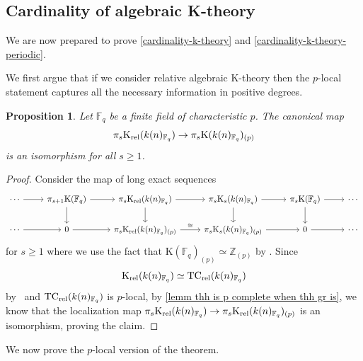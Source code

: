 \documentclass[english,10pt]{amsart}
\newcommand{\field}{\mathbb{F}}
\newtheorem{prop}{Proposition}[section]
\theoremstyle{definition}
\numberwithin{equation}{section}
\begin{document}
\subsection{Cardinality of algebraic K-theory}
We are now prepared to prove \autoref{cardinality-k-theory} and \autoref{cardinality-k-theory-periodic}. 

We first argue that if we consider relative algebraic K-theory then the $p$-local statement captures all the necessary information in positive degrees. 
\begin{prop}\label{relative-p-local}
Let $\field_q$ be a finite field of characteristic $p$. The canonical map 
\[ \pi_s\mathrm{K}_{\textup{rel}}(k(n)_{\field_q})\to \pi_s\mathrm{K}(k(n)_{\field_q})_{(p)}
\]
is an isomorphism for all $s\ge 1$. 
\end{prop}
\begin{proof}
Consider the map of long exact sequences 
\[
\begin{tikzcd}
\cdots \arrow{r} & \pi_{s+1}\mathrm{K}(\field_q) \arrow{d} \arrow{r} & \pi_s\mathrm{K}_{\textup{rel}}(k(n)_{\field_q})\arrow{r} \arrow{d}&  \pi_s\mathrm{K}_{s}(k(n)_{\field_q}) \arrow{r} \arrow{d} & \pi_s\mathrm{K}(\field_q) \arrow{d}\arrow{r} & \cdots \\ 
\cdots \arrow{r} & 0 \arrow{r} & \pi_s\mathrm{K}_{\textup{rel}}(k(n)_{\field_q})_{(p)} \arrow{r}{\cong} & \pi_s\mathrm{K}_{s}(k(n)_{\field_q})_{(p)} \arrow{r} & 0 \arrow{r} & \cdots 
\end{tikzcd}
\] 
for $s\ge 1$ where we use the fact that  $\mathrm{K}(\field_q)_{(p)}\simeq \mathbb{Z}_{(p)}$ by \cite{Qui72}. Since 
\[\mathrm{K}_{\textup{rel}}(k(n)_{\field_q})\simeq \mathrm{TC}_{\textup{rel}}(k(n)_{\field_q})\]
by~\cite[Theorem~7.0.0.2]{DGM13} and $\mathrm{TC}_{\textup{rel}}(k(n)_{\field_q})$ is $p$-local, by \autoref{lemm thh is p complete when thh gr is}, we know that the localization map $\pi_s\mathrm{K}_{\textup{rel}}(k(n)_{\field_q})\to \pi_s\mathrm{K}_{\textup{rel}}(k(n)_{\field_q})_{(p)} $ is an isomorphism, proving the claim. 
\end{proof}

We now prove the $p$-local version of the theorem. 
\end{document}
